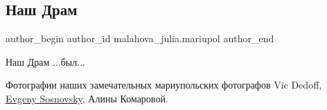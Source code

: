  
 
 
 
 

\subsection{Наш Драм}
\label{sec:23_12_2022.fb.malahova_julia.mariupol.1.nash_dram}

\ifcmt
 author_begin
   author_id malahova_julia.mariupol
 author_end
\fi

Наш Драм ...был...

Фотографии наших замечательных мариупольских фотографов Vic Dedoff,
\href{https://www.facebook.com/evgeny.sosnovsky}{Evgeny Sosnovsky},  Алины
Комаровой.
